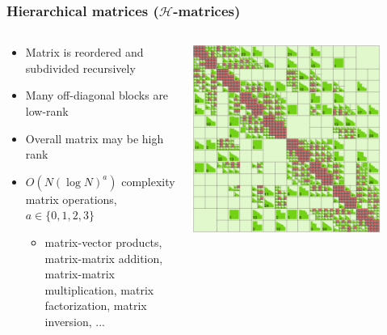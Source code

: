 \documentclass[10pt,final,xcolor=dvipsnames]{beamer}
\begin{document}
\begin{frame}
  \frametitle{Hierarchical matrices ($\mathcal{H}$-matrices)}

    \begin{columns}
    \begin{column}{0.7\paperwidth}
       \begin{itemize}
		\item Matrix is reordered and subdivided recursively
		\item Many off-diagonal blocks are low-rank
		\item Overall matrix may be high rank
		\item $O(N \left(\log N\right)^a)$ complexity matrix operations, $a \in \{0,1,2,3\}$
		\begin{itemize}
			\item matrix-vector products, matrix-matrix addition, matrix-matrix multiplication, matrix factorization, matrix inversion, ...
		\end{itemize}
	\end{itemize}
    \end{column}
    \hspace{-0.4in}
    \begin{column}{0.3\paperwidth}
    \vspace{0.1in}
      \centering\includegraphics[width=0.85\textwidth]{extraplots/heat_inverse_problem_Hfull_hmatrix.eps}
    \end{column}
    \end{columns}


\end{frame}
\end{document}
